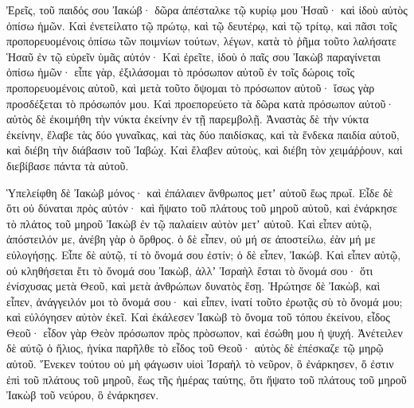 {Ἐρεῖς, τοῦ παιδός σου Ἰακώβ· δῶρα ἀπέσταλκε τῷ κυρίῳ μου Ἡσαῦ· καὶ ἰδοὺ αὐτὸς ὀπίσω ἡμῶν.
Καὶ ἐνετείλατο τῷ πρώτῳ, καὶ τῷ δευτέρῳ, καὶ τῷ τρίτῳ, καὶ πᾶσι τοῖς προπορευομένοις ὀπίσω τῶν ποιμνίων τούτων, λέγων, κατὰ τὸ ῥῆμα τοῦτο λαλήσατε Ἡσαῦ ἐν τῷ εὑρεῖν ὑμᾶς αὐτόν·
Καὶ ἐρεῖτε, ἰδοὺ ὁ παῖς σου Ἰακὼβ παραγίνεται ὀπίσω ἡμῶν· εἶπε γὰρ, ἐξιλάσομαι τὸ πρόσωπον αὐτοῦ ἐν τοῖς δώροις τοῖς προπορευομένοις αὐτοῦ, καὶ μετὰ τοῦτο ὄψομαι τὸ πρόσωπον αὐτοῦ· ἴσως γὰρ προσδέξεται τὸ πρόσωπόν μου.
Καὶ προεπορεύετο τὰ δῶρα κατὰ πρόσωπον αὐτοῦ· αὐτὸς δὲ ἐκοιμήθη τὴν νύκτα ἐκείνην ἐν τῇ παρεμβολῇ.
Ἀναστὰς δὲ τὴν νύκτα ἐκείνην, ἔλαβε τὰς δύο γυναῖκας, καὶ τὰς δύο παιδίσκας, καὶ τὰ ἕνδεκα παιδία αὐτοῦ, καὶ διέβη τὴν διάβασιν τοῦ Ἰαβώχ.
Καὶ ἔλαβεν αὐτοὺς, καὶ διέβη τὸν χειμάῤῥουν, καὶ διεβίβασε πάντα τὰ αὐτοῦ.
\par }{\PP {}Ὑπελείφθη δὲ Ἰακὼβ μόνος· καὶ ἐπάλαιεν ἄνθρωπος μετʼ αὐτοῦ ἕως πρωΐ.
Εἶδε δὲ ὅτι οὐ δύναται πρὸς αὐτόν· καὶ ἥψατο τοῦ πλάτους τοῦ μηροῦ αὐτοῦ, καὶ ἐνάρκησε τὸ πλάτος τοῦ μηροῦ Ἰακὼβ ἐν τῷ παλαίειν αὐτὸν μετʼ αὐτοῦ.
Καὶ εἶπεν αὐτῷ, ἀπόστειλόν με, ἀνέβη γὰρ ὁ ὄρθρος. ὁ δὲ εἶπεν, οὐ μή σε ἀποστείλω, ἐὰν μή με εὐλογήσῃς.
Εἶπε δὲ αὐτῷ, τί τὸ ὄνομά σου ἐστίν; ὁ δὲ εἶπεν, Ἰακώβ.
Καὶ εἶπεν αὐτῷ, οὐ κληθήσεται ἔτι τὸ ὄνομά σου Ἰακὼβ, ἀλλʼ Ἰσραὴλ ἔσται τὸ ὄνομά σου· ὅτι ἐνίσχυσας μετὰ Θεοῦ, καὶ μετὰ ἀνθρώπων δυνατὸς ἔσῃ.
Ἠρώτησε δὲ Ἰακὼβ, καὶ εἶπεν, ἀνάγγειλόν μοι τὸ ὄνομά σου· καὶ εἶπεν, ἱνατί τοῦτο ἐρωτᾷς σὺ τὸ ὄνομά μου; καὶ εὐλόγησεν αὐτὸν ἐκεῖ.
Καὶ ἐκάλεσεν Ἰακὼβ τὸ ὄνομα τοῦ τόπου ἐκείνου, εἶδος Θεοῦ· εἶδον γὰρ Θεὸν πρόσωπον πρὸς πρὸσωπον, καὶ ἐσώθη μου ἡ ψυχή.
Ἀνέτειλεν δὲ αὐτῷ ὁ ἥλιος, ἡνίκα παρῆλθε τὸ εἶδος τοῦ Θεοῦ· αὐτὸς δὲ ἐπέσκαζε τῷ μηρῷ αὐτοῦ.
Ἕνεκεν τούτου οὐ μὴ φάγωσιν υἱοὶ Ἰσραὴλ τὸ νεῦρον, ὃ ἐνάρκησεν, ὅ ἐστιν ἐπὶ τοῦ πλάτους τοῦ μηροῦ, ἕως τῆς ἡμέρας ταύτης, ὅτι ἥψατο τοῦ πλάτους τοῦ μηροῦ Ἰακὼβ τοῦ νεύρου, ὃ ἐνάρκησεν.

}
